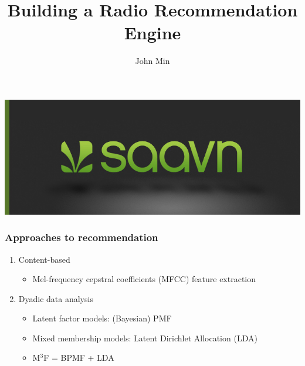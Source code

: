 \documentclass{beamer}
\begin{document}
\title{Building a Radio Recommendation Engine}
\author{John Min}

\begin{frame}
	\begin{center}
		\includegraphics[scale=0.3]{saavn}
	\end{center}
	\titlepage
\end{frame}


\begin{frame}
	\frametitle{Approaches to recommendation}
	\begin{enumerate}
		\item Content-based \\

			\begin{itemize}
				\item Mel-frequency cepstral coefficients (MFCC) feature extraction \\
			\end{itemize}	

		\item Dyadic data analysis
			\begin{itemize}		
				\item Latent factor models:  (Bayesian) PMF
				\item Mixed membership models: Latent Dirichlet Allocation (LDA)
				\item M$^3$F = BPMF + LDA
			\end{itemize}		
	\end{enumerate}
\end{frame}
\end{document}
